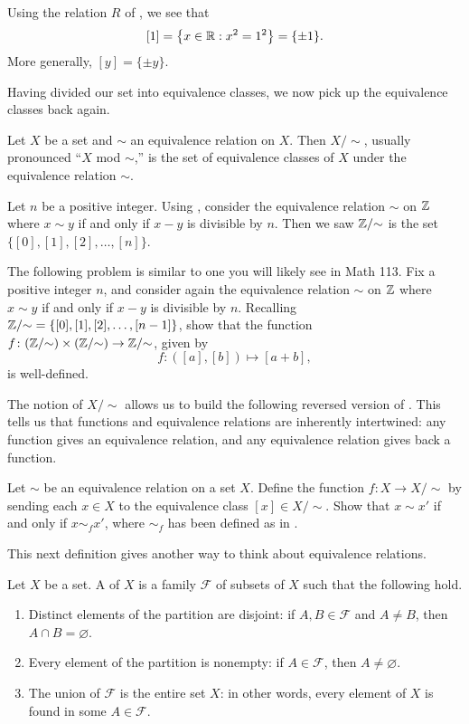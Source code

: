\documentclass[../main.tex]{subfiles}
\begin{document}
\begin{example}
    Using the relation $R$ of , we see that
    \[[1]=\left\{x\in\mathbb R:x^2=1^2\right\}=\{\pm1\}.\]
    More generally, $[y]=\{\pm y\}$.
\end{example}
Having divided our set into equivalence classes, we now pick up the equivalence classes back again.
\begin{definition}
    Let $X$ be a set and $\sim$ an equivalence relation on $X$. Then $X / {\sim}$, usually pronounced ``$X$ mod $\sim$,'' is the set of equivalence classes of $X$ under the equivalence relation $\sim$.
\end{definition}
\begin{example}
    Let $n$ be a positive integer. Using , consider the equivalence relation $\sim$ on $\mathbb Z$ where $x \sim y$ if and only if $x-y$ is divisible by $n$. Then we saw $\mathbb Z /{\sim}$ is the set $\{[0], [1], [2], \dotsc, [n]\}$.
\end{example}
\begin{exercise}
    The following problem is similar to one you will likely see in Math 113. Fix a positive integer $n$, and consider again the equivalence relation $\sim$ on $\mathbb Z$ where $x \sim y$ if and only if $x-y$ is divisible by $n$. Recalling $\mathbb Z/{\sim}=\{[0], [1], [2], \dotsc, [n - 1]\}$, show that the function $f\colon (\mathbb Z /{\sim}) \times (\mathbb Z /{\sim}) \to \mathbb Z /{\sim}$, given by
    \[f\colon([a], [b]) \mapsto [a + b],\]
    is well-defined.
\end{exercise}
The notion of $X/{\sim}$ allows us to build the following reversed version of . This tells us that functions and equivalence relations are inherently intertwined: any function gives an equivalence relation, and any equivalence relation gives back a function.
\begin{exe}
    Let $\sim$ be an equivalence relation on a set $X$. Define the function $f\colon X\to X/{\sim}$ by sending each $x\in X$ to the equivalence class $[x]\in X/{\sim}$. Show that $x\sim x'$ if and only if $x\sim_fx'$, where $\sim_f$ has been defined as in .
\end{exe}
This next definition gives another way to think about equivalence relations.
\begin{definition}[partition]
    Let $X$ be a set. A  of $X$ is a family $\mathcal{F}$ of subsets of $X$ such that the following hold.
    \begin{enumerate}[label=(\alph*)]
        \item Distinct elements of the partition are disjoint: if $A, B \in \mathcal{F}$ and $A \neq B$, then $A \cap B = \varnothing$.
        \item Every element of the partition is nonempty: if $A \in \mathcal{F}$, then $A \neq \varnothing$.
        \item The union of $\mathcal{F}$ is the entire set $X$: in other words, every element of $X$ is found in some $A \in \mathcal{F}$.
    \end{enumerate}
\end{definition}
\end{document}
